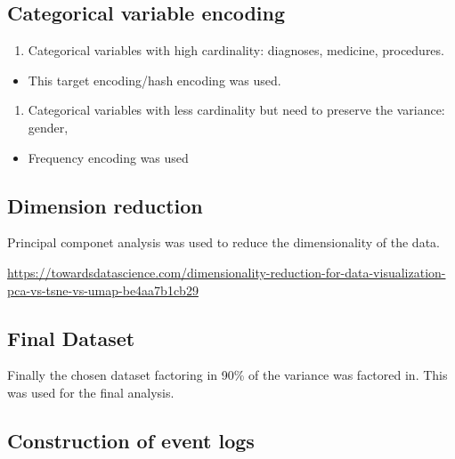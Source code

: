 \documentclass[
]{article}
\providecommand{\tightlist}{%
  \setlength{\itemsep}{0pt}\setlength{\parskip}{0pt}}
\begin{document}
\hypertarget{categorical-variable-encoding}{%
\subsection{Categorical variable
encoding}\label{categorical-variable-encoding}}

\begin{enumerate}
\def\labelenumi{\arabic{enumi}.}
\tightlist
\item
  Categorical variables with high cardinality: diagnoses, medicine,
  procedures.
\end{enumerate}

\begin{itemize}
\tightlist
\item
  This target encoding/hash encoding was used.
\end{itemize}

\begin{enumerate}
\def\labelenumi{\arabic{enumi}.}
\setcounter{enumi}{1}
\tightlist
\item
  Categorical variables with less cardinality but need to preserve the
  variance: gender,
\end{enumerate}

\begin{itemize}
\tightlist
\item
  Frequency encoding was used
\end{itemize}

\hypertarget{dimension-reduction}{%
\subsection{Dimension reduction}\label{dimension-reduction}}

Principal componet analysis was used to reduce the dimensionality of the
data.

\url{https://towardsdatascience.com/dimensionality-reduction-for-data-visualization-pca-vs-tsne-vs-umap-be4aa7b1cb29}

\hypertarget{final-dataset}{%
\subsection{Final Dataset}\label{final-dataset}}

Finally the chosen dataset factoring in 90\% of the variance was
factored in. This was used for the final analysis.

\hypertarget{construction-of-event-logs}{%
\subsection{Construction of event
logs}\label{construction-of-event-logs}}
\end{document}
